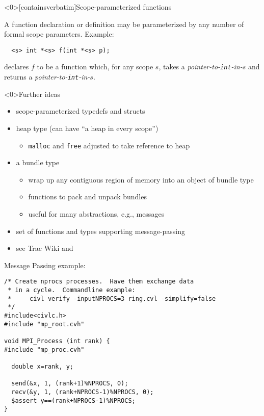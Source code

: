 \documentclass[t]{beamer}
\begin{document}
\begin{frame}<0>[containsverbatim]{Scope-parameterized functions}

  A function declaration or definition may be parameterized by any number
  of \alert{formal scope parameters}.   Example:

  \begin{mycbox}{7cm}
\begin{verbatim}
  <s> int *<s> f(int *<s> p);
\end{verbatim}
  \end{mycbox}

  declares $f$ to be a function which, for any scope $s$, takes a
  \emph{pointer-to-\texttt{int}-in-$s$} and returns a
  \emph{pointer-to-\texttt{int}-in-$s$}.

\end{frame}

\begin{frame}<0>{Further ideas}
  \begin{itemize}
  \item scope-parameterized \alert{typedefs} and \alert{structs}
  \item \alert{heap} type (can have ``a heap in every scope'')
    \begin{itemize}
    \item \texttt{malloc} and \texttt{free} adjusted to take reference to heap
    \end{itemize}
  \item a \alert{bundle type}
    \begin{itemize}
    \item wrap up any contiguous region of memory into an object of bundle type
    \item functions to \alert{pack} and \alert{unpack} bundles
    \item useful for many abstractions, e.g., messages
    \end{itemize}
  \item set of functions and types supporting \alert{message-passing}
  \item see Trac Wiki and 
  \end{itemize}
\end{frame}

\begin{frame}[containsverbatim]{Message Passing example: }

\begin{verbatim}
/* Create nprocs processes.  Have them exchange data
 * in a cycle.  Commandline example:
 *     civl verify -inputNPROCS=3 ring.cvl -simplify=false
 */
#include<civlc.h>
#include "mp_root.cvh"

void MPI_Process (int rank) {
#include "mp_proc.cvh"

  double x=rank, y;

  send(&x, 1, (rank+1)%NPROCS, 0);
  recv(&y, 1, (rank+NPROCS-1)%NPROCS, 0);
  $assert y==(rank+NPROCS-1)%NPROCS;
}
\end{verbatim}
\end{frame}
\end{document}
